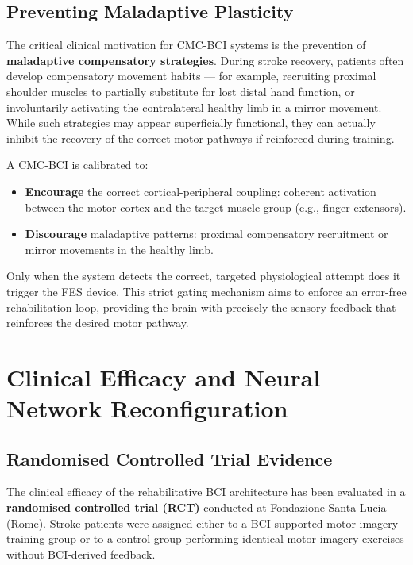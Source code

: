 \documentclass[10pt, letterpaper]{report}
\begin{document}
\subsection{Preventing Maladaptive Plasticity}

The critical clinical motivation for CMC-BCI systems is the prevention of
\textbf{maladaptive compensatory strategies}. During stroke recovery, patients often
develop compensatory movement habits — for example, recruiting proximal shoulder
muscles to partially substitute for lost distal hand function, or involuntarily activating the
contralateral healthy limb in a mirror movement. While such strategies may appear
superficially functional, they can actually inhibit the recovery of the correct motor
pathways if reinforced during training.

A CMC-BCI is calibrated to:
\begin{itemize}
  \item \textbf{Encourage} the correct cortical-peripheral coupling: coherent activation
  between the motor cortex and the target muscle group (e.g., finger extensors).
  \item \textbf{Discourage} maladaptive patterns: proximal compensatory recruitment or
  mirror movements in the healthy limb.
\end{itemize}

Only when the system detects the correct, targeted physiological attempt does it trigger
the FES device. This strict gating mechanism aims to enforce an error-free rehabilitation
loop, providing the brain with precisely the sensory feedback that reinforces the desired
motor pathway.

\section{Clinical Efficacy and Neural Network Reconfiguration}

\subsection{Randomised Controlled Trial Evidence}

The clinical efficacy of the rehabilitative BCI architecture has been evaluated in a
\textbf{randomised controlled trial (RCT)} conducted at Fondazione Santa Lucia (Rome).
Stroke patients were assigned either to a BCI-supported motor imagery training group or
to a control group performing identical motor imagery exercises without BCI-derived
feedback.
\end{document}
